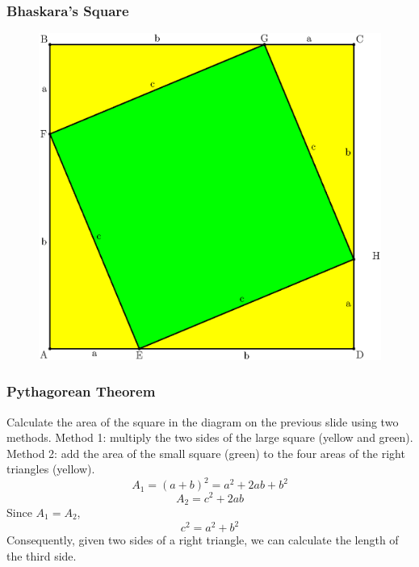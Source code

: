 \documentclass[xcolor=dvipsnames]{beamer}
\begin{document}
\begin{frame}
  \frametitle{Bhaskara's Square}
  \begin{figure}[h]
    \includegraphics[scale=.5]{./pythagoras.eps}
  \end{figure}
\end{frame}

\begin{frame}
  \frametitle{Pythagorean Theorem}
  Calculate the area of the square in the diagram on the previous
  slide using two methods. Method 1: multiply the two sides of the
  large square (yellow and green). Method 2: add the area of the small
  square (green) to the four areas of the right triangles (yellow).
\begin{equation}
  \label{eq:aemoakee}
  A_{1}=(a+b)^{2}=a^{2}+2ab+b^{2}
\end{equation}
\begin{equation}
  \label{eq:eimelaij}
  A_{2}=c^{2}+2ab
\end{equation}
Since $A_{1}=A_{2}$, 
\begin{equation}
  \label{eq:eisheebi}
  c^{2}=a^{2}+b^{2}
\end{equation}
Consequently, given two sides of a right triangle, we can calculate
the length of the third side.
\end{frame}
\end{document}

